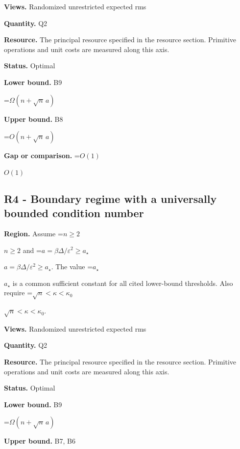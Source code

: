 \documentclass[10pt,a4paper]{article}
\newcommand{\AtlasMath}[1]{\par\begingroup\centering\setbox0=\hbox{$\displaystyle #1$}\ifdim\wd0>1.4\linewidth\typeout{ATLAS WIDE FORMULA: \the\wd0}\fi\ifdim\wd0>\linewidth\resizebox{\linewidth}{!}{\box0}\else\box0\fi\par\endgroup}
\newcommand{\AtlasInlineMath}[1]{\begingroup\setbox0=\hbox{$#1$}\ifdim\wd0>.4\linewidth\endgroup\AtlasMath{#1}\else\endgroup$#1$\fi}
\begin{document}
\textbf{Views.} Randomized unrestricted expected rms



\textbf{Quantity.} Q2



\textbf{Resource.} The principal resource specified in the resource section. Primitive operations and unit costs are measured along this axis.



\textbf{Status.} Optimal



\textbf{Lower bound.} B9



\AtlasMath{\Omega(n+\sqrt n\,a)}


\textbf{Upper bound.} B8



\AtlasMath{O(n+\sqrt n\,a)}


\textbf{Gap or comparison.} \AtlasInlineMath{O(1)}



\subsection{R4 - Boundary regime with a universally bounded condition number}


\textbf{Region.} Assume \AtlasInlineMath{n\ge2} and \AtlasInlineMath{a=\beta\Delta/\varepsilon^2\ge a_\star}. The value \AtlasInlineMath{a_\star} is a common sufficient constant for all cited lower-bound thresholds. Also require \AtlasInlineMath{\sqrt n<\kappa<\kappa_0}.



\textbf{Views.} Randomized unrestricted expected rms



\textbf{Quantity.} Q2



\textbf{Resource.} The principal resource specified in the resource section. Primitive operations and unit costs are measured along this axis.



\textbf{Status.} Optimal



\textbf{Lower bound.} B9



\AtlasMath{\Omega(n+\sqrt n\,a)}


\textbf{Upper bound.} B7, B6
\end{document}

